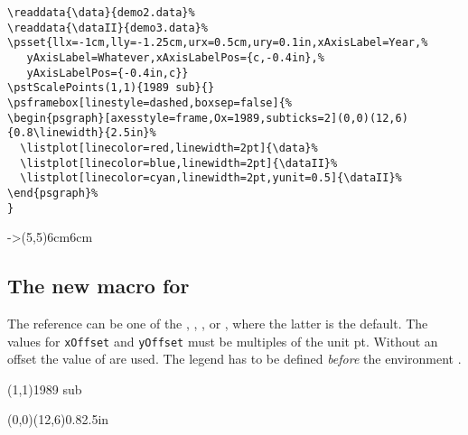 \documentclass[11pt,english,BCOR10mm,DIV12,bibliography=totoc,parskip=false,smallheadings
    headexclude,footexclude,oneside,dvipsnames,svgnames]{pst-doc}
\begin{document}
\begin{lstlisting}
\readdata{\data}{demo2.data}%
\readdata{\dataII}{demo3.data}%
\psset{llx=-1cm,lly=-1.25cm,urx=0.5cm,ury=0.1in,xAxisLabel=Year,%
   yAxisLabel=Whatever,xAxisLabelPos={c,-0.4in},%
   yAxisLabelPos={-0.4in,c}}
\pstScalePoints(1,1){1989 sub}{}
\psframebox[linestyle=dashed,boxsep=false]{%
\begin{psgraph}[axesstyle=frame,Ox=1989,subticks=2](0,0)(12,6){0.8\linewidth}{2.5in}%
  \listplot[linecolor=red,linewidth=2pt]{\data}%
  \listplot[linecolor=blue,linewidth=2pt]{\dataII}%
  \listplot[linecolor=cyan,linewidth=2pt,yunit=0.5]{\dataII}%
\end{psgraph}%
}
\end{lstlisting}


\begin{LTXexample}[width=7cm]
\begin{psgraph}{->}(5,5){6cm}{6cm}
\end{psgraph}
\end{LTXexample}


\subsection{The new macro  for }\label{pslegend}

\begin{BDef}
\end{BDef}

The reference can be one of the , , , or , where the
latter is the default. The values for \texttt{xOffset} and \texttt{yOffset} must be multiples of the unit pt.
Without an offset the value of  are used.
The legend has to be defined \emph{before} the environment .

\medskip
\begin{center}
%
%
\pstScalePoints(1,1){1989 sub}{}
\begin{psgraph}[axesstyle=frame,Ox=1989,subticks=2](0,0)(12,6){0.8\linewidth}{2.5in}%
  \listplot[linecolor=red,linewidth=2pt]{\data}%
  \listplot[linecolor=blue,linewidth=2pt]{\dataII}%
  \listplot[linecolor=cyan,linewidth=2pt,yunit=0.5]{\dataII}%
\end{psgraph}%
\end{center}
\end{document}
